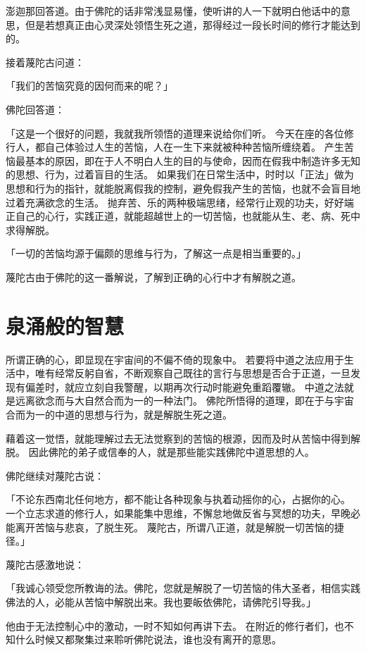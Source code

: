 \documentclass[twoside,openany]{book}
\begin{document}
澎迦那回答道。由于佛陀的话非常浅显易懂，使听讲的人一下就明白他话中的意思，但是若想真正由心灵深处领悟生死之道，那得经过一段长时间的修行才能达到的。

接着蔑陀古问道：

「我们的苦恼究竟的因何而来的呢？」

佛陀回答道：

「这是一个很好的问题，我就我所领悟的道理来说给你们听。
今天在座的各位修行人，都自己体验过人生的苦恼，人在一生下来就被种种苦恼所缠绕着。
产生苦恼最基本的原因，即在于人不明白人生的目的与使命，因而在假我中制造许多无知的思想、行为，过着盲目的生活。
如果我们在日常生活中，时时以「正法」做为思想和行为的指针，就能脱离假我的控制，避免假我产生的苦恼，也就不会盲目地过着充满欲念的生活。
抛弃苦、乐的两种极端思绪，经常行止观的功夫，好好端正自己的心行，实践正道，就能超越世上的一切苦恼，也就能从生、老、病、死中求得解脱。

「一切的苦恼均源于偏颇的思维与行为，了解这一点是相当重要的。」

蔑陀古由于佛陀的这一番解说，了解到正确的心行中才有解脱之道。

\section{泉涌般的智慧}\label{sec5.3}

所谓正确的心，即显现在宇宙间的不偏不倚的现象中。
若要将中道之法应用于生活中，唯有经常反躬自省，不断观察自己既往的言行与思想是否合于正道，一旦发现有偏差时，就应立刻自我警醒，以期再次行动时能避免重蹈覆辙。
中道之法就是远离欲念而与大自然合而为一的一种法门。
佛陀所悟得的道理，即在于与宇宙合而为一的中道的思想与行为，就是解脱生死之道。

藉着这一觉悟，就能理解过去无法觉察到的苦恼的根源，因而及时从苦恼中得到解脱。
因此佛陀的弟子或信奉的人，就是那些能实践佛陀中道思想的人。

佛陀继续对蔑陀古说：

「不论东西南北任何地方，都不能让各种现象与执着动摇你的心，占据你的心。
一个立志求道的修行人，如果能集中思维，不懈怠地做反省与冥想的功夫，早晚必能离开苦恼与悲哀，了脱生死。
蔑陀古，所谓八正道，就是解脱一切苦恼的捷径。」

蔑陀古感激地说：

「我诚心领受您所教诲的法。佛陀，您就是解脱了一切苦恼的伟大圣者，相信实践佛法的人，必能从苦恼中解脱出来。我也要皈依佛陀，请佛陀引导我。」

他由于无法控制心中的激动，一时不知如何再讲下去。
在附近的修行者们，也不知什么时候又都聚集过来聆听佛陀说法，谁也没有离开的意思。
\end{document}
